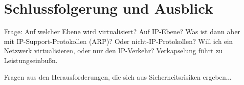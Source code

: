 \documentclass{lni}
\begin{document}
\section{Schlussfolgerung und Ausblick}
\label{sec:schluss}
Frage: Auf welcher Ebene wird virtualisiert? Auf IP-Ebene? Was ist dann aber mit IP-Support-Protokollen (ARP)? Oder nicht-IP-Protokollen? Will ich ein Netzwerk virtualisieren, oder nur den IP-Verkehr? Verkapselung führt zu Leistungseinbußn. \cite{cabuk2007towards}

Fragen aus den Herausforderungen, die sich aus Sicherheitsrisiken ergeben...



{}
\end{document}
